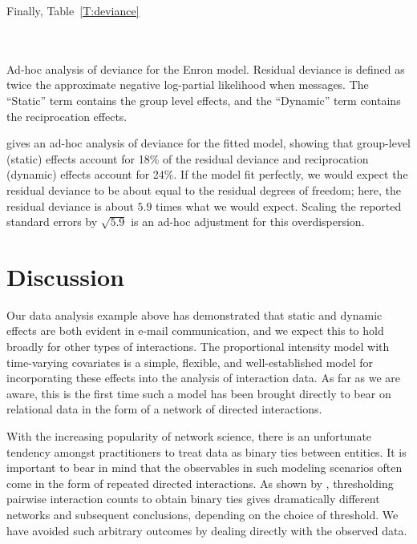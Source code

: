\documentclass[final]{statsoc}
\begin{document}
Finally, Table~\ref{T:deviance}
\begin{table}
    \makebox[\textwidth]{}
    \\
    \\
    \caption{
        Ad-hoc analysis of deviance for the Enron model.  Residual deviance
        is defined as twice the approximate negative log-partial likelihood
        when messages.  The ``Static'' term contains the group level effects,
        and the ``Dynamic'' term contains the reciprocation effects.
    }
    \label{T:deviance}
\end{table}
gives an ad-hoc analysis of deviance for the fitted model, showing that
group-level (static) effects account for 18\% of the residual deviance and
reciprocation (dynamic) effects account for 24\%.  If the model fit
perfectly, we would expect the residual deviance to be about equal to the
residual degrees of freedom; here, the residual deviance is about $5.9$
times what we would expect.  Scaling the reported standard errors by
$\sqrt{5.9}$ is an ad-hoc adjustment for this overdispersion.


\section{Discussion}\label{S:discussion}

Our data analysis example above has demonstrated that static and dynamic
effects are both evident in e-mail communication, and we expect this to
hold broadly for other types of interactions.  The proportional intensity
model with time-varying covariates is a simple, flexible, and
well-established model for incorporating these effects into the analysis
of interaction data.  As far as we are aware, this is the first time
such a model has been brought directly to bear on relational data in
the form of a network of directed interactions.

With the increasing popularity of network science, there is an unfortunate
tendency amongst practitioners to treat data as binary ties between entities.
It is important to bear in mind that the observables in such modeling
scenarios often come in the form of repeated directed interactions.  As
shown by \citet{dechoudhury2010}, thresholding pairwise interaction
counts to obtain binary ties gives dramatically different networks and
subsequent conclusions, depending on the choice of threshold.  We have
avoided such arbitrary outcomes by dealing directly with the observed
data.
\end{document}
